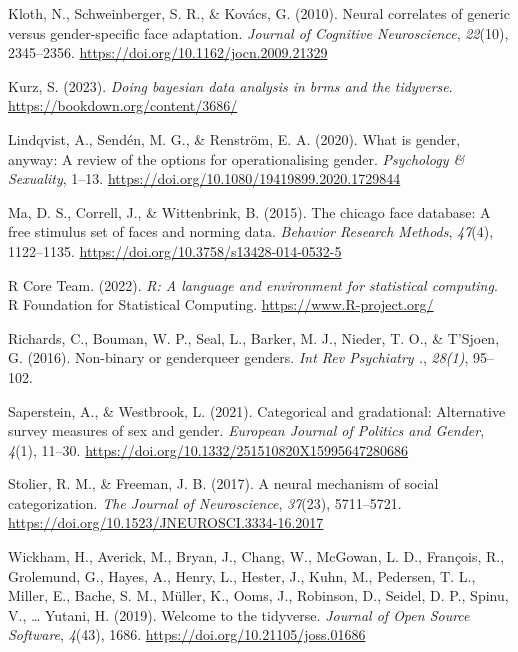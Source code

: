 \documentclass[
  man]{apa7}
\newlength{\cslhangindent}
\newlength{\cslentryspacingunit} %
\newenvironment{CSLReferences}[2] %
 {%
  \setlength{\parindent}{0pt}
  \ifodd #1
  \let\oldpar\par
  \def\par{\hangindent=\cslhangindent\oldpar}
  \fi
  \setlength{\parskip}{#2\cslentryspacingunit}
 }%
 {}
\begin{document}
\begin{CSLReferences}{1}{0}
\leavevmode{}%
Kloth, N., Schweinberger, S. R., \& Kovács, G. (2010). Neural correlates of generic versus gender-specific face adaptation. \emph{Journal of Cognitive Neuroscience}, \emph{22}(10), 2345--2356. \url{https://doi.org/10.1162/jocn.2009.21329}

\leavevmode{}%
Kurz, S. (2023). \emph{Doing bayesian data analysis in brms and the tidyverse}. \url{https://bookdown.org/content/3686/}

\leavevmode{}%
Lindqvist, A., Sendén, M. G., \& Renström, E. A. (2020). What is gender, anyway: A review of the options for operationalising gender. \emph{Psychology \& Sexuality}, 1--13. \url{https://doi.org/10.1080/19419899.2020.1729844}

\leavevmode{}%
Ma, D. S., Correll, J., \& Wittenbrink, B. (2015). The chicago face database: A free stimulus set of faces and norming data. \emph{Behavior Research Methods}, \emph{47}(4), 1122--1135. \url{https://doi.org/10.3758/s13428-014-0532-5}

\leavevmode{}%
R Core Team. (2022). \emph{R: A language and environment for statistical computing}. R Foundation for Statistical Computing. \url{https://www.R-project.org/}

\leavevmode{}%
Richards, C., Bouman, W. P., Seal, L., Barker, M. J., Nieder, T. O., \& T'Sjoen, G. (2016). Non-binary or genderqueer genders. \emph{Int Rev Psychiatry .}, \emph{28(1)}, 95--102.

\leavevmode{}%
Saperstein, A., \& Westbrook, L. (2021). Categorical and gradational: Alternative survey measures of sex and gender. \emph{European Journal of Politics and Gender}, \emph{4}(1), 11--30. \url{https://doi.org/10.1332/251510820X15995647280686}

\leavevmode{}%
Stolier, R. M., \& Freeman, J. B. (2017). A neural mechanism of social categorization. \emph{The Journal of Neuroscience}, \emph{37}(23), 5711--5721. \url{https://doi.org/10.1523/JNEUROSCI.3334-16.2017}

\leavevmode{}%
Wickham, H., Averick, M., Bryan, J., Chang, W., McGowan, L. D., François, R., Grolemund, G., Hayes, A., Henry, L., Hester, J., Kuhn, M., Pedersen, T. L., Miller, E., Bache, S. M., Müller, K., Ooms, J., Robinson, D., Seidel, D. P., Spinu, V., \ldots{} Yutani, H. (2019). Welcome to the {tidyverse}. \emph{Journal of Open Source Software}, \emph{4}(43), 1686. \url{https://doi.org/10.21105/joss.01686}

\end{CSLReferences}
\end{document}
